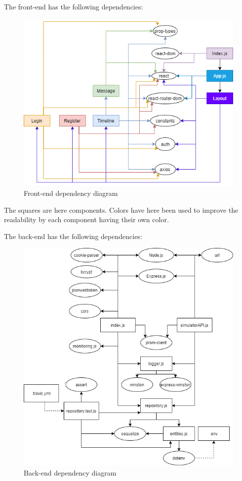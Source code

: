The front-end has the following dependencies:
\begin{figure}[H]
    \centering
    \includegraphics[width=0.9\linewidth]{report/images/Frontend-dependencies.png}
    \caption{Front-end dependency diagram}
    \label{fig:front-end-depencency-diagram}
\end{figure}
The squares are here components. Colors have here been used to improve the readability by each component having their own color. 

\newpage
The back-end has the following dependencies:
\begin{figure}[H]
    \centering
    \includegraphics[width=1\linewidth]{report/images/backend-dependencies.png}
    \caption{Back-end dependency diagram}
    \label{fig:back-end-depencency-diagram}
\end{figure}

